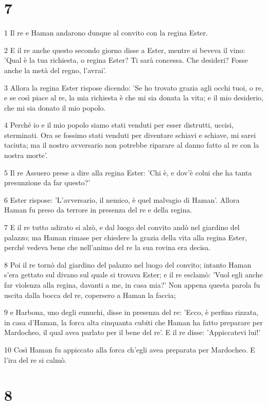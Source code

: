\chapter{7}

\par 1 Il re e Haman andarono dunque al convito con la regina Ester.
\par 2 E il re anche questo secondo giorno disse a Ester, mentre si beveva il vino: 'Qual è la tua richiesta, o regina Ester? Ti sarà concessa. Che desideri? Fosse anche la metà del regno, l'avrai'.
\par 3 Allora la regina Ester rispose dicendo: 'Se ho trovato grazia agli occhi tuoi, o re, e se così piace al re, la mia richiesta è che mi sia donata la vita; e il mio desiderio, che mi sia donato il mio popolo.
\par 4 Perché io e il mio popolo siamo stati venduti per esser distrutti, uccisi, sterminati. Ora se fossimo stati venduti per diventare schiavi e schiave, mi sarei taciuta; ma il nostro avversario non potrebbe riparare al danno fatto al re con la nostra morte'.
\par 5 Il re Assuero prese a dire alla regina Ester: 'Chi è, e dov'è colui che ha tanta presunzione da far questo?'
\par 6 Ester rispose: 'L'avversario, il nemico, è quel malvagio di Haman'. Allora Haman fu preso da terrore in presenza del re e della regina.
\par 7 E il re tutto adirato si alzò, e dal luogo del convito andò nel giardino del palazzo; ma Haman rimase per chiedere la grazia della vita alla regina Ester, perché vedeva bene che nell'animo del re la sua rovina era decisa.
\par 8 Poi il re tornò dal giardino del palazzo nel luogo del convito; intanto Haman s'era gettato sul divano sul quale si trovava Ester; e il re esclamò: 'Vuol egli anche far violenza alla regina, davanti a me, in casa mia?' Non appena questa parola fu uscita dalla bocca del re, copersero a Haman la faccia;
\par 9 e Harbona, uno degli eunuchi, disse in presenza del re: 'Ecco, è perfino rizzata, in casa d'Haman, la forca alta cinquanta cubiti che Haman ha fatto preparare per Mardocheo, il qual avea parlato per il bene del re'. E il re disse: 'Appiccatevi lui!'
\par 10 Così Haman fu appiccato alla forca ch'egli avea preparata per Mardocheo. E l'ira del re si calmò.

\chapter{8}

